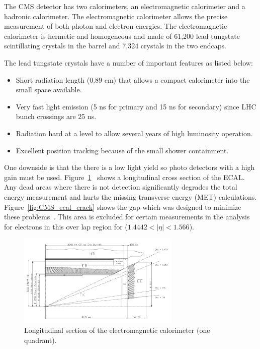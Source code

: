 The CMS detector has two calorimeters, an electromagnetic calorimeter and a hadronic calorimeter. The electromagnetic calorimeter allows the precise measurement of both photon and electron energies.  The electromagnetic calorimeter is hermetic and homogeneous and made of 61,200 lead tungstate scintillating crystals in the barrel and 7,324 crystals in the two endcaps.~\cite{ECAL_report}

The lead tungstate crystals have a number of important features as listed below:
\begin{itemize}
  \item
    Short radiation length (0.89 cm) that allows a compact calorimeter into the small space available.
  \item
    Very fast light emission (5 ns for primary and 15 ns for secondary) since LHC bunch crossings are 25 ns.
    \item
      Radiation hard at a level to allow several years of high luminosity operation.
    \item
      Excellent position tracking because of the small shower containment. 
\end{itemize}

One downside is that the there is a low light yield so photo detectors with a high gain must be used.  Figure~\ref{fig:CMS_ecal_quadrant}~\cite{ECAL_report} shows a longitudinal cross section of the ECAL. Any dead areas where there is not detection significantly degrades the total energy measurement and hurts the missing transverse energy (MET) calculations. Figure~\ref{fig:CMS_ecal_crack} shows the gap which was designed to minimize these problems~\cite{ECAL_report}.  This area is excluded for certain measurements in the analysis for electrons in this over lap region for ($1.4442 < |\eta| < 1.566$).

\begin{figure}[htb]
\centering
\includegraphics[width=0.69\textwidth]{Experiment/ECAL_quadrant.pdf}
\caption{Longitudinal section of the electromagnetic calorimeter (one quadrant).~\cite{ECAL_report}}
\label{fig:CMS_ecal_quadrant}
\end{figure}

